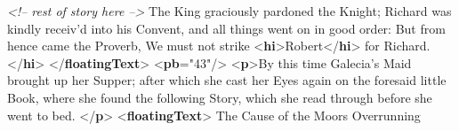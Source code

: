 \begin{shaded}
\textit{<!-- rest of story here -->}\mbox{}\newline 
\hspace*{1em}The King graciously pardoned the Knight; Richard was kindly receiv'd\mbox{}\newline 
\hspace*{1em}\hspace*{1em}\hspace*{1em}\hspace*{1em} into his Convent, and all things went on in good order: But from hence\mbox{}\newline 
\hspace*{1em}\hspace*{1em}\hspace*{1em}\hspace*{1em} came the Proverb, We must not strike {<\textbf{hi}>}Robert{</\textbf{hi}>} for\mbox{}\newline 
\hspace*{1em}Richard.{</\textbf{hi}>}\mbox{}\newline 
\hspace*{1em}\mbox{}\newline 
{}\mbox{}\newline 
{</\textbf{floatingText}>}\mbox{}\newline 
{<\textbf{pb}\hspace*{1em}{n}="{43}"/>}\mbox{}\newline 
{<\textbf{p}>}By this time Galecia's Maid brought up her Supper; after which she\mbox{}\newline 
 cast her Eyes again on the foresaid little Book, where she found the\mbox{}\newline 
 following Story, which she read through before she went to bed.\mbox{}\newline 
{</\textbf{p}>}\mbox{}\newline 
{<\textbf{floatingText}>}\mbox{}\newline 
{}\mbox{}\newline 
\hspace*{1em}The Cause of the Moors Overrunning\mbox{}\newline 

\end{shaded}
